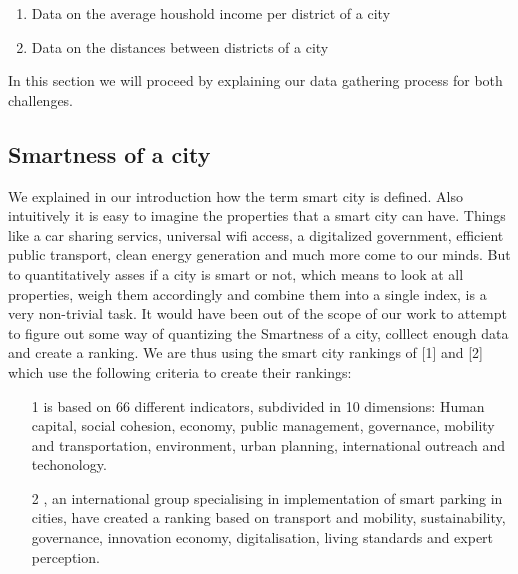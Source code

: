 \documentclass[a4paper, 10pt, conference]{ieeeconf}      %
\begin{document}
\begin{enumerate}
	\item  Data on the average houshold income per district of a city
	\item Data on the distances between districts of a city 
\end{enumerate}

In this section we will proceed by explaining our data gathering process for both challenges. 


\subsection{Smartness of a city}
We explained in our introduction how the term smart city is defined. Also intuitively it is easy to imagine the properties
that a smart city can have. Things like a car sharing servics, universal wifi access, a digitalized government, efficient public transport,
clean energy generation and much more come to our minds. But to quantitatively asses if a city is smart or not, which means to look at 
all properties, weigh them accordingly and combine them into a single index, is a very non-trivial task. It would have been out of the 
scope of our work to attempt to figure out some way of quantizing the Smartness of a city, colllect enough data and create a ranking.
We are thus using the smart city rankings of [1] and [2] which use the following criteria to create their rankings:\newline

\begin{itemize}
\item [1] is based on 66 different indicators, subdivided in 10 dimensions:
Human capital, social cohesion, economy, public management, governance, mobility and transportation, environment, urban planning, international outreach and techonology.
\item [2], an international group specialising in implementation of smart parking in cities, have created a ranking based on transport and mobility, sustainability, governance, innovation economy, digitalisation, living standards and expert perception.
\end{itemize}
\end{document}
